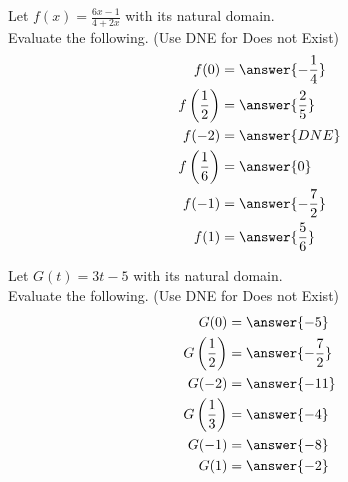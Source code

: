 \documentclass{ximera}
\author{Lee Wayand}
\begin{document}
\begin{exercise}

Let $f(x) = \frac{6x-1}{4 + 2x}$ with its natural domain. \\

Evaluate the following.  (Use DNE for Does not Exist) \\


\begin{align*}
f(0) &= \answer{-\frac{1}{4}} \\
f\left(\frac{1}{2}\right) &= \answer{\frac{2}{5}} \\
f(-2)    &= \answer{DNE} \\
f\left(\frac{1}{6}\right) &= \answer{0} \\
f(-1) &= \answer{-\frac{7}{2}}  \\
f(1) &= \answer{\frac{5}{6}}
\end{align*}


\end{exercise}












\begin{exercise}

Let $G(t) = 3t - 5$ with its natural domain. \\

Evaluate the following.  (Use DNE for Does not Exist) \\


\begin{align*}
G(0) &= \answer{-5} \\
G\left(\frac{1}{2}\right) &= \answer{-\frac{7}{2}} \\
G(-2)    &= \answer{-11} \\
G\left(\frac{1}{3}\right) &= \answer{-4} \\
G(-1) &= \answer{-8}  \\
G(1) &= \answer{-2}
\end{align*}

\end{exercise}
\end{document}
